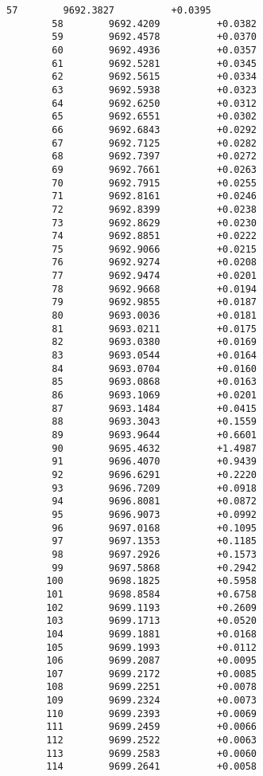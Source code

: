\documentclass[11pt]{article}
\begin{document}
\begin{Verbatim}[commandchars=\\\{\}]
        57        9692.3827          +0.0395
        58        9692.4209          +0.0382
        59        9692.4578          +0.0370
        60        9692.4936          +0.0357
        61        9692.5281          +0.0345
        62        9692.5615          +0.0334
        63        9692.5938          +0.0323
        64        9692.6250          +0.0312
        65        9692.6551          +0.0302
        66        9692.6843          +0.0292
        67        9692.7125          +0.0282
        68        9692.7397          +0.0272
        69        9692.7661          +0.0263
        70        9692.7915          +0.0255
        71        9692.8161          +0.0246
        72        9692.8399          +0.0238
        73        9692.8629          +0.0230
        74        9692.8851          +0.0222
        75        9692.9066          +0.0215
        76        9692.9274          +0.0208
        77        9692.9474          +0.0201
        78        9692.9668          +0.0194
        79        9692.9855          +0.0187
        80        9693.0036          +0.0181
        81        9693.0211          +0.0175
        82        9693.0380          +0.0169
        83        9693.0544          +0.0164
        84        9693.0704          +0.0160
        85        9693.0868          +0.0163
        86        9693.1069          +0.0201
        87        9693.1484          +0.0415
        88        9693.3043          +0.1559
        89        9693.9644          +0.6601
        90        9695.4632          +1.4987
        91        9696.4070          +0.9439
        92        9696.6291          +0.2220
        93        9696.7209          +0.0918
        94        9696.8081          +0.0872
        95        9696.9073          +0.0992
        96        9697.0168          +0.1095
        97        9697.1353          +0.1185
        98        9697.2926          +0.1573
        99        9697.5868          +0.2942
       100        9698.1825          +0.5958
       101        9698.8584          +0.6758
       102        9699.1193          +0.2609
       103        9699.1713          +0.0520
       104        9699.1881          +0.0168
       105        9699.1993          +0.0112
       106        9699.2087          +0.0095
       107        9699.2172          +0.0085
       108        9699.2251          +0.0078
       109        9699.2324          +0.0073
       110        9699.2393          +0.0069
       111        9699.2459          +0.0066
       112        9699.2522          +0.0063
       113        9699.2583          +0.0060
       114        9699.2641          +0.0058

\end{Verbatim}
\end{document}
